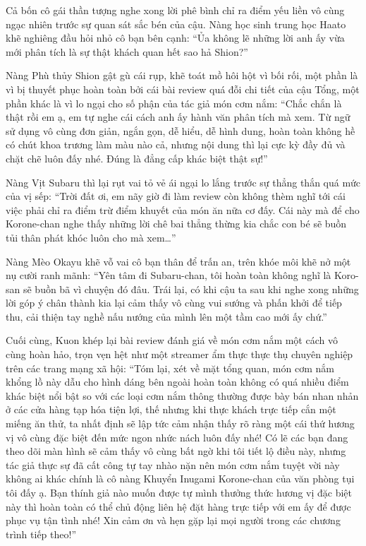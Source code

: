 \documentclass[../main.tex]{subfiles}
\begin{document}
Cả bốn cô gái thần tượng nghe xong lời phê bình chỉ ra điểm yếu liền vô cùng ngạc nhiên trước sự quan sát sắc bén của cậu. Nàng học sinh trung học Haato khẽ nghiêng đầu hỏi nhỏ cô bạn bên cạnh: ``Ủa không lẽ những lời anh ấy vừa mới phân tích là sự thật khách quan hết sao hả Shion?''

Nàng Phù thủy Shion gật gù cái rụp, khẽ toát mồ hôi hột vì bối rối, một phần là vì bị thuyết phục hoàn toàn bởi cái bài review quá đỗi chi tiết của cậu Tổng, một phần khác là vì lo ngại cho số phận của tác giả món cơm nắm: ``Chắc chắn là thật rồi em ạ, em tự nghe cái cách anh ấy hành văn phân tích mà xem. Từ ngữ sử dụng vô cùng đơn giản, ngắn gọn, dễ hiểu, dễ hình dung, hoàn toàn không hề có chút khoa trương làm màu nào cả, nhưng nội dung thì lại cực kỳ đầy đủ và chặt chẽ luôn đấy nhé. Đúng là đẳng cấp khác biệt thật sự!''

Nàng Vịt Subaru thì lại rụt vai tỏ vẻ ái ngại lo lắng trước sự thẳng thắn quá mức của vị sếp: ``Trời đất ơi, em nãy giờ đi làm review còn không thèm nghĩ tới cái việc phải chỉ ra điểm trừ điểm khuyết của món ăn nữa cơ đấy. Cái này mà để cho Korone-chan nghe thấy những lời chê bai thẳng thừng kia chắc con bé sẽ buồn tủi thân phát khóc luôn cho mà xem\dots''

Nàng Mèo Okayu khẽ vỗ vai cô bạn thân để trấn an, trên khóe môi khẽ nở một nụ cười ranh mãnh: ``Yên tâm đi Subaru-chan, tôi hoàn toàn không nghĩ là Koro-san sẽ buồn bã vì chuyện đó đâu. Trái lại, có khi cậu ta sau khi nghe xong những lời góp ý chân thành kia lại cảm thấy vô cùng vui sướng và phấn khởi để tiếp thu, cải thiện tay nghề nấu nướng của mình lên một tầm cao mới ấy chứ.''

Cuối cùng, Kuon khép lại bài review đánh giá về món cơm nắm một cách vô cùng hoàn hảo, trọn vẹn hệt như một streamer ẩm thực thực thụ chuyên nghiệp trên các trang mạng xã hội: ``Tóm lại, xét về mặt tổng quan, món cơm nắm khổng lồ này dẫu cho hình dáng bên ngoài hoàn toàn không có quá nhiều điểm khác biệt nổi bật so với các loại cơm nắm thông thường được bày bán nhan nhản ở các cửa hàng tạp hóa tiện lợi, thế nhưng khi thực khách trực tiếp cắn một miếng ăn thử, ta nhất định sẽ lập tức cảm nhận thấy rõ ràng một cái thứ hương vị vô cùng đặc biệt đến mức ngon nhức nách luôn đấy nhé! Có lẽ các bạn đang theo dõi màn hình sẽ cảm thấy vô cùng bất ngờ khi tôi tiết lộ điều này, nhưng tác giả thực sự đã cất công tự tay nhào nặn nên món cơm nắm tuyệt vời này không ai khác chính là cô nàng Khuyển Inugami Korone-chan của văn phòng tụi tôi đấy ạ. Bạn thính giả nào muốn được tự mình thưởng thức hương vị đặc biệt này thì hoàn toàn có thể chủ động liên hệ đặt hàng trực tiếp với em ấy để được phục vụ tận tình nhé! Xin cảm ơn và hẹn gặp lại mọi người trong các chương trình tiếp theo!''
\end{document}
